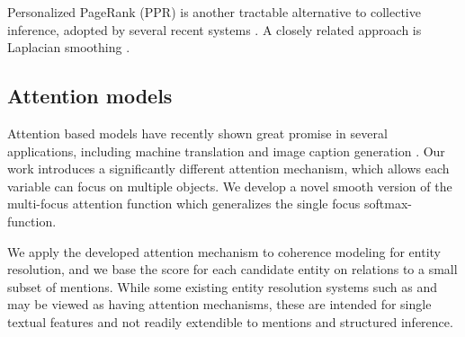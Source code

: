 Personalized PageRank (PPR) \cite{jeh2003scaling} is another tractable alternative to collective inference, adopted by several recent systems \cite{Han2011,He13,Alhelbawy14,Pershina2015}. A closely related approach is Laplacian smoothing \cite{Huang2014}. 


\subsection{Attention models}
Attention based models have recently shown great promise in several applications, including machine translation \cite{bahdanau2014neural} and image caption generation \cite{xu2015show}.  
Our work introduces a significantly different attention mechanism, which allows each variable can focus on multiple objects. 
We develop a novel smooth version of the multi-focus attention function which generalizes the single focus softmax-function.

We apply the developed attention mechanism to coherence modeling for entity resolution, and we base the score for each candidate entity on relations to a small subset of mentions. While some existing entity resolution systems such as  and  may be viewed as having attention mechanisms, these are intended for single textual features and not readily extendible to mentions and structured inference.



